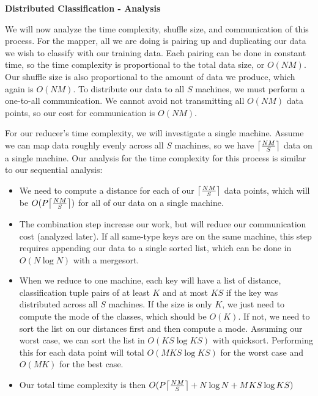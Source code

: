 \vspace{5 mm}
\noindent
\textbf{Distributed Classification - Analysis}

\vspace{5 mm}
\noindent
We will now analyze the time complexity, shuffle size, and communication of
this process. For the mapper, all we are doing is pairing up and duplicating our
data we wish to classify with our training data. Each pairing can be done in
constant time, so the time complexity is proportional to the total data size,
or $O(N M)$. Our shuffle size is also proportional to the amount of data we
produce, which again is $O(N M)$. To distribute our data to all $S$ machines, 
we must perform a one-to-all communication. We cannot avoid not transmitting 
all $O(N M)$ data points, so our cost for communication is $O(N M)$.

\vspace{5 mm}
\noindent
For our reducer's time complexity, we will investigate a single machine. Assume 
we can map data roughly evenly across all $S$ machines, so we have 
$\ceil*{\frac{N M}{S}}$ data on a single machine. Our analysis for the time 
complexity for this process is similar to our sequential analysis:

\begin{itemize}
\item We need to compute a distance for each of our $\ceil*{\frac{N M}{S}}$ 
data points, which will be $O(P \ceil*{\frac{N M}{S}})$ for all of our data on 
a single machine. 
\item The combination step increase our work, but will reduce our communication 
cost (analyzed later). If all same-type keys are on the same machine, this 
step requires appending our data to a single sorted list, which can be done in 
$O(N \log N)$ with a mergesort.
\item When we reduce to one machine, each key will have a list of distance, 
classification tuple pairs of at least $K$ and at most $K S$ if the key was 
distributed across all $S$ machines. If the size is only $K$, we just need to 
compute the mode of the classes, which should be $O(K)$. If not, we need to 
sort the list on our distances first and then compute a mode. Assuming our 
worst case, we can sort the list in $O(K S \log K S)$ with quicksort. 
Performing this for each data point will total $O(M K S \log K S)$ for the 
worst case and $O(M K)$ for the best case.
\item Our total time complexity is then 
$O(P \ceil*{\frac{N M}{S}} + N \log N + M K S \log K S)$
\end{itemize}

